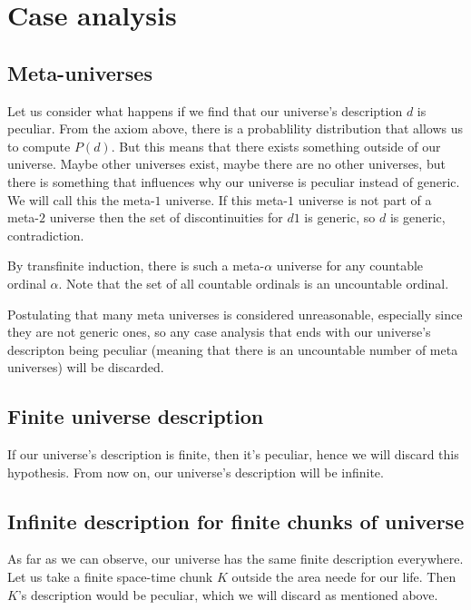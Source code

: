 \documentclass[a4paper
,draft
]{article}
\begin{document}
\section{Case analysis}

\subsection{Meta-universes}

Let us consider what happens if we find that our universe's description $d$ is peculiar. From the axiom above, there is a probablility distribution that allows us to compute $P(d)$. But this means that there exists something outside of our universe. Maybe other universes exist, maybe there are no other universes, but there is something that influences why our universe is peculiar instead of generic. We will call this the meta-$1$ universe. If this meta-$1$ universe is not part of a meta-$2$ universe then the set of discontinuities for $d1$ is generic, so $d$ is generic, contradiction.

By transfinite induction, there is such a meta-$\alpha$ universe for any countable ordinal $\alpha$. Note that the set of all countable ordinals is an uncountable ordinal.

Postulating that many meta universes is considered unreasonable, especially since they are not generic ones, so any case analysis that ends with our universe's descripton being peculiar (meaning that there is an uncountable number of meta universes) will be discarded.

\subsection{Finite universe description}

If our universe's description is finite, then it's peculiar, hence we will discard this hypothesis. From now on, our universe's description will be infinite.

\subsection{Infinite description for finite chunks of universe}

As far as we can observe, our universe has the same finite description everywhere. Let us take a finite space-time chunk $K$ outside the area neede for our life. Then $K$'s description would be peculiar, which we will discard as mentioned above.
\end{document}
